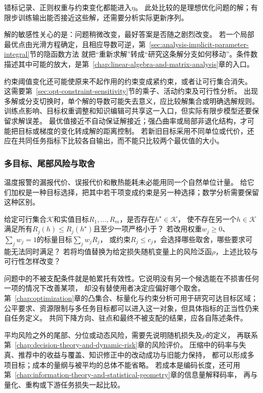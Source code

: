 错标记录、正则权重与约束变化都能进入$\eta$。
此处比较的是理想优化问题的解；有限步训练输出能否接近这些解，还需要分析实际更新序列。

解的敏感性关心的是：问题稍微改变，最好答案是否随之剧烈改变。
若一个局部最优点由光滑方程确定，且相应导数可逆，第~\ref{sec:analysis-implicit-parameter-integral}节的隐函数方法
就把“重新求解”转成“研究这条解分支如何移动”。条件数描述其中可能的放大，是第~\ref{chap:linear-algebra-and-matrix-analysis}章的入口。

约束阈值变化还可能使原来不起作用的约束变成紧约束，或者让可行集合消失。
这需要第~\ref{sec:opt-constraint-sensitivity}节的乘子、活动约束及可行性分析。
出现多解或分支切换时，单个解的导数可能失去意义，应比较解集合或明确选解规则。
训练点影响、目标权重调整和知识编辑可共享这一入口，但实际有限步模型还要保留求解误差。
最优值接近不自动保证解接近；强凸曲率或局部非退化结构，才可能把目标或梯度的变化转成解的距离控制。
若新旧目标采用不同单位或代价，还应在共同任务指标下比较各自输出，而不能只比较两个最优值的大小。

\subsubsection{多目标、尾部风险与取舍}
\label{sec:future-analysis-multiple-objectives}

温度报警的漏报代价、误报代价和散热能耗未必能用同一个自然单位计量。
给它们加权是一种目标选择，把其中若干项变成约束是另一种选择；数学分析需要保留这种区别。

\begin{mathproblem}
  \label{question:future-multiple-objectives}
  给定可行集合$\mathcal K$和实值目标$R_1,\ldots,R_m$，是否存在$h^\star\in\mathcal K$，
  使不存在另一个$h\in\mathcal K$满足所有$R_j(h)\leq R_j(h^\star)$且至少一项严格小于？
  若改用权重$w_j\geq0$、$\sum_jw_j=1$的标量目标$\sum_jw_jR_j$，
  或约束$R_j\leq c_j$，会选择哪些取舍，哪些要求可能无法同时满足？
  若将均值替换为给定损失随机变量上的风险泛函$\rho$，上述比较与可行性怎样改变？
\end{mathproblem}

问题中的不被支配条件就是帕累托有效性。它说明没有另一个候选能在不损害任何一项的情况下改善某项，
却没有替使用者决定应偏好哪个取舍。
第~\ref{chap:optimization}章的凸集合、标量化与约束分析可用于研究可达目标区域；
公平要求、资源限制与多任务目标都可以进入这一对象，但具体指标的正当性仍来自任务定义。
共同下降方向、驻点和最终不被支配的结果，应各自陈述条件。

平均风险之外的尾部、分位或动态风险，需要先说明随机损失及$\rho$的定义，
再联系第~\ref{chap:decision-theory-and-dynamic-risk}章的风险评价。
压缩中的码率与失真、推荐中的收益与覆盖、知识修正中的改动成功与旧能力保持，
都可以形成多项目标；成本的量纲与被平均的总体不能省略。
若成本是编码长度，还可用第~\ref{chap:information-theory-and-statistical-geometry}章的信息量解释码率，
再与量化、重构或下游任务损失一起比较。

